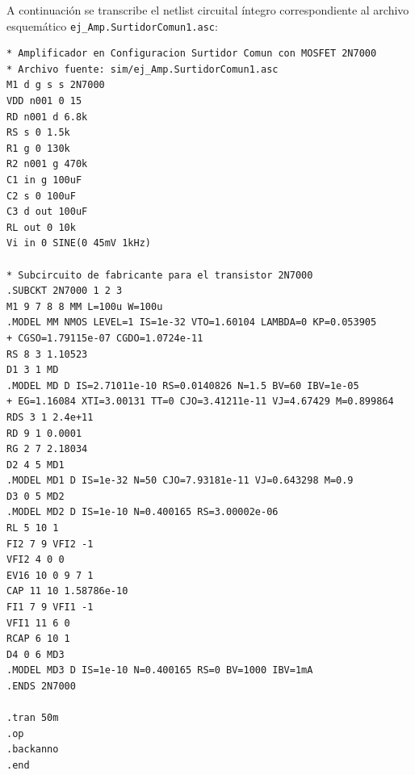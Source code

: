 A continuación se transcribe el netlist circuital íntegro correspondiente al archivo esquemático
\texttt{ej\_Amp.SurtidorComun1.asc}:

\begin{lstlisting}[style=ltspice, caption={Netlist de simulación para el amplificador en surtidor común en LTspice.}, label={list:netlist_surtidor_comun}]
* Amplificador en Configuracion Surtidor Comun con MOSFET 2N7000
* Archivo fuente: sim/ej_Amp.SurtidorComun1.asc
M1 d g s s 2N7000
VDD n001 0 15
RD n001 d 6.8k
RS s 0 1.5k
R1 g 0 130k
R2 n001 g 470k
C1 in g 100uF
C2 s 0 100uF
C3 d out 100uF
RL out 0 10k
Vi in 0 SINE(0 45mV 1kHz)

* Subcircuito de fabricante para el transistor 2N7000
.SUBCKT 2N7000 1 2 3
M1 9 7 8 8 MM L=100u W=100u
.MODEL MM NMOS LEVEL=1 IS=1e-32 VTO=1.60104 LAMBDA=0 KP=0.053905
+ CGSO=1.79115e-07 CGDO=1.0724e-11
RS 8 3 1.10523
D1 3 1 MD
.MODEL MD D IS=2.71011e-10 RS=0.0140826 N=1.5 BV=60 IBV=1e-05
+ EG=1.16084 XTI=3.00131 TT=0 CJO=3.41211e-11 VJ=4.67429 M=0.899864
RDS 3 1 2.4e+11
RD 9 1 0.0001
RG 2 7 2.18034
D2 4 5 MD1
.MODEL MD1 D IS=1e-32 N=50 CJO=7.93181e-11 VJ=0.643298 M=0.9
D3 0 5 MD2
.MODEL MD2 D IS=1e-10 N=0.400165 RS=3.00002e-06
RL 5 10 1
FI2 7 9 VFI2 -1
VFI2 4 0 0
EV16 10 0 9 7 1
CAP 11 10 1.58786e-10
FI1 7 9 VFI1 -1
VFI1 11 6 0
RCAP 6 10 1
D4 0 6 MD3
.MODEL MD3 D IS=1e-10 N=0.400165 RS=0 BV=1000 IBV=1mA
.ENDS 2N7000

.tran 50m
.op
.backanno
.end
\end{lstlisting}
